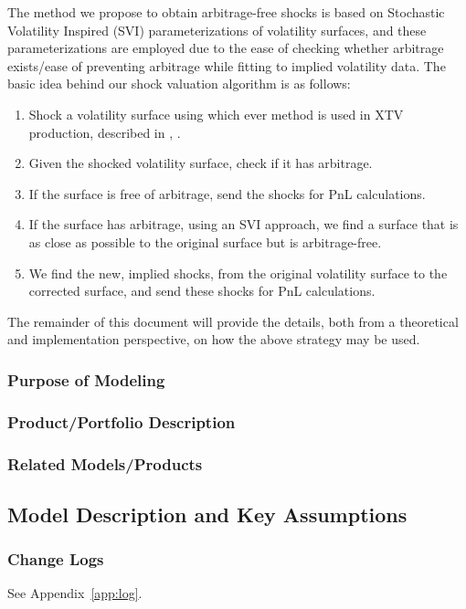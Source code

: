 \documentclass[11pt,letterpaper]{article}
\begin{document}
The method we propose to obtain arbitrage-free shocks is based on Stochastic Volatility Inspired (SVI) parameterizations of volatility surfaces, and these parameterizations are employed due to the ease of checking whether arbitrage exists/ease of preventing arbitrage while fitting to implied volatility data. The basic idea behind our shock valuation algorithm is as follows:
\begin{enumerate}
\item Shock a volatility surface using which ever method is used in XTV production, described in \cite{xtv}, \cite{rmsr_xtv}.
\item Given the shocked volatility surface, check if it has arbitrage.
\item If the surface is free of arbitrage, send the shocks for PnL calculations.
\item If the surface has arbitrage, using an SVI approach, we find a surface that is as close as possible to the original surface but is arbitrage-free. 
\item We find the new, implied shocks, from the original volatility surface to the corrected surface, and send these shocks for PnL calculations.
\end{enumerate}
The remainder of this document will provide the details, both from a theoretical and implementation perspective, on how the above strategy may be used. 



\subsubsection{Purpose of Modeling}
\subsubsection{Product/Portfolio Description}
\subsubsection{Related Models/Products}
\subsection{Model Description and Key Assumptions}
\subsubsection{Change Logs}
See Appendix~\ref{app:log}. 
\end{document}
